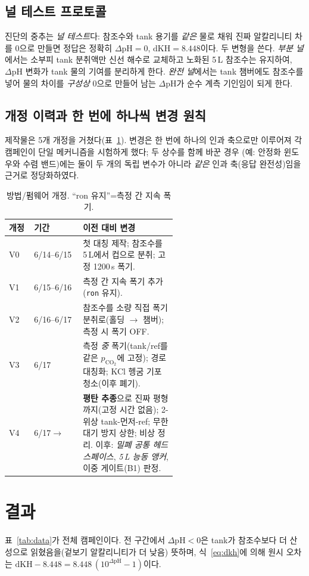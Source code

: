 \documentclass[11pt]{article}
\newcommand{\dpH}{\ensuremath{\Delta\mathrm{pH}}}
\newcommand{\pco}{\ensuremath{p_{\mathrm{CO_2}}}}
\begin{document}
\subsection{널 테스트 프로토콜}
진단의 중추는 \emph{널 테스트}다: 참조수와 tank 용기를 \emph{같은} 물로 채워 진짜
알칼리니티 차를 0으로 만들면 정답은 정확히 $\dpH=0$, $\mathrm{dKH}=8.448$이다. 두
변형을 쓴다. \emph{부분 널}에서는 소부피 tank 분취액만 신선 해수로 교체하고 노화된
5\,L 참조수는 유지하여, \dpH{} 변화가 tank 물의 기여를 분리하게 한다. \emph{완전
널}에서는 tank 챔버에도 참조수를 넣어 물의 차이를 \emph{구성상} 0으로 만들어 남는
\dpH{}가 순수 계측 기인임이 되게 한다.

\subsection{개정 이력과 한 번에 하나씩 변경 원칙}
제작물은 5개 개정을 거쳤다(표~\ref{tab:versions}). 변경은 한 번에 하나의 인과 축으로만
이루어져 각 캠페인이 단일 메커니즘을 시험하게 했다; 두 상수를 함께 바꾼 경우
(예: 안정화 윈도우와 수렴 밴드)에는 둘이 두 개의 독립 변수가 아니라 \emph{같은}
인과 축(응답 완전성)임을 근거로 정당화하였다.

\begin{table}[t]
\centering
\caption{방법/펌웨어 개정. ``ron 유지''=측정 간 지속 폭기.}
\label{tab:versions}
\footnotesize
\begin{tabular}{@{}llp{0.56\linewidth}@{}}
\toprule
개정 & 기간 & 이전 대비 변경 \\
\midrule
V0 & 6/14--6/15 & 첫 대칭 제작; 참조수를 5\,L에서 컵으로 분취; 고정 1200\,s 폭기. \\
V1 & 6/15--6/16 & 측정 간 지속 폭기 추가(\texttt{ron} 유지). \\
V2 & 6/16--6/17 & 참조수를 소량 직접 폭기 분취로(홀딩 $\to$ 챔버); 측정 시 폭기 OFF. \\
V3 & 6/17 & 측정 \emph{중} 폭기(tank/ref를 같은 \pco{}에 고정); 경로 대칭화; KCl 헹굼 기포 청소(이후 폐기). \\
V4 & 6/17$\to$ & \textbf{평탄 추종}으로 진짜 평형까지(고정 시간 없음); 2-위상 tank-먼저-ref; 무한대기 방지 상한; 비상 정리. 이후: \emph{밀폐 공통 헤드스페이스}, \emph{5\,L 능동 앵커}, 이중 게이트(B1) 판정. \\
\bottomrule
\end{tabular}
\end{table}

\section{결과}\label{sec:results}
표~\ref{tab:data}가 전체 캠페인이다. 전 구간에서 $\dpH<0$은 tank가 참조수보다 더
산성으로 읽혔음을(겉보기 알칼리니티가 더 낮음) 뜻하며, 식~\eqref{eq:dkh}에 의해 원시
오차는 $\mathrm{dKH}-8.448 = 8.448\,(10^{\dpH}-1)$이다.
\end{document}
